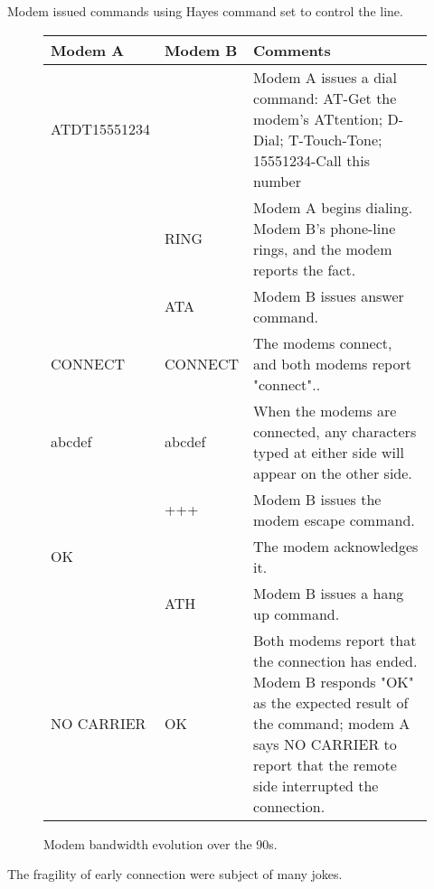 Modem issued commands using Hayes command set to control the line. \\
\par
 \begin{figure}[H]
\centering  
\begin{tabularx}{\textwidth}{ L{0.2} L{0.15} L{0.65}}
  \toprule
  \textbf{Modem A} & \textbf{Modem B} & \textbf{Comments} \\
  \toprule 
   
    ATDT15551234 &	&	Modem A issues a dial command: AT-Get the modem's ATtention; D-Dial; T-Touch-Tone; 15551234-Call this number\\
    \toprule 
      & RING	& Modem A begins dialing. Modem B's phone-line rings, and the modem reports the fact.\\
      \toprule 
    & ATA	& Modem B issues answer command.\\
    \toprule 
    CONNECT	& CONNECT	& The modems connect, and both modems report "connect"..\\
    abcdef	& abcdef	& When the modems are connected, any characters typed at either side will appear on the other side.\\
    \toprule 
    & +++	& Modem B issues the modem escape command.\\
    \toprule 
     OK &	& The modem acknowledges it.\\
    \toprule 
    & ATH	& Modem B issues a hang up command.\\
    \toprule 
    NO CARRIER &	OK	& Both modems report that the connection has ended. Modem B responds "OK" as the expected result of the command; modem A says NO CARRIER to report that the remote side interrupted the connection.\\
   \toprule
\end{tabularx}
\caption{Modem bandwidth evolution over the 90s.}
\end{figure}
\par
The fragility of early connection were subject of many jokes.\\

\par
{}